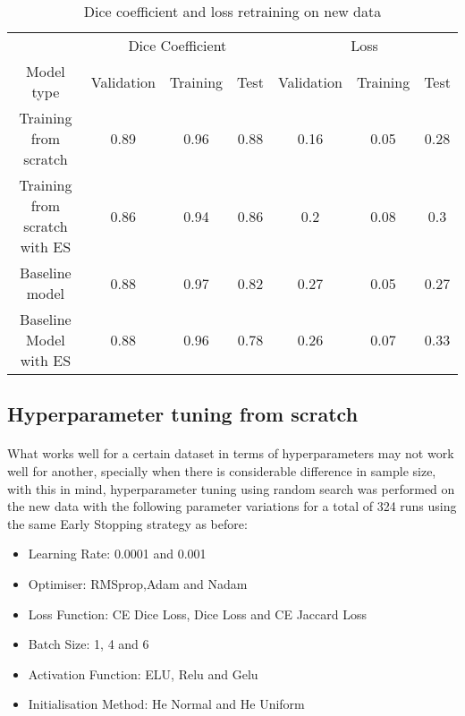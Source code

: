 \begin{table}[ht] 
    \begin{center}
    \begin{tabular}{ccccccc} 
    \toprule
       & \multicolumn{3}{c}{Dice Coefficient}     & \multicolumn{3}{c}{Loss} \\
    Model type & Validation & Training & Test & Validation    & Training    & Test   \\ \midrule
    \rowcolor{lightgray}
    Training from scratch & 0.89 & 0.96 & 0.88 & 0.16 & 0.05 & 0.28  \\ Training from scratch with ES & 0.86 & 0.94 & 0.86 & 0.2 & 0.08 & 0.3  \\ Baseline model & 0.88 & 0.97 & 0.82 & 0.27 & 0.05 & 0.27  \\ Baseline Model with ES & 0.88 & 0.96 & 0.78 & 0.26 & 0.07 & 0.33  \\
    \bottomrule
    \end{tabular}
  \end{center} 
  \caption{Dice coefficient and loss retraining on new data}\label{tab_fs}
\end{table}

\subsection{Hyperparameter tuning from scratch}
\paragraph{}
What works well for a certain dataset in terms of hyperparameters may not work well for another, specially when there is considerable difference in sample size, with this in mind,  hyperparameter tuning using random search was performed on the new data with the following parameter variations for a total of 324 runs using the same Early Stopping strategy as before:

\begin{itemize}
    \item{Learning Rate: 0.0001 and 0.001}
    \item{Optimiser: RMSprop,Adam and Nadam}
    \item{Loss Function: CE Dice Loss, Dice Loss and CE Jaccard Loss}
    \item{Batch Size: 1, 4 and 6}
    \item{Activation Function: ELU, Relu and Gelu}
    \item{Initialisation Method: He Normal and He Uniform}
\end{itemize}
